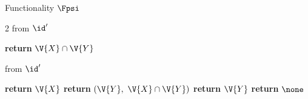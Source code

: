 \begin{interface}[nofloat]{Functionality $\Fpsi$ \\
}
{\begin{multicols}{2}
 \quad from $\id'$
\begin{algorithmic}[1]
\algcont
{}
\State \textbf{return} $\V{X} \cap \V{Y}$ \label{ln:psione}
\algsave
\end{algorithmic}
\vspace{1.4ex}

 \quad from $\id'$
\begin{algorithmic}[1]
\algcont
{}
  \State \textbf{return} $\V{X}$ \label{ln:psileaks}
\EndIf
{}
  \State \textbf{return} $(\V{Y},\ \V{X} \cap \V{Y})$ \label{ln:psileakr}
\EndIf
{}
  \State \textbf{return} $\V{Y}$
\EndIf
\State \textbf{return} $\none$
\algsave
\end{algorithmic}
\end{multicols}}
\end{interface}

